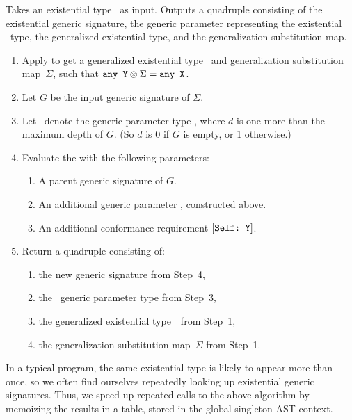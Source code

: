 \documentclass[../generics]{subfiles}
\begin{document}
\begin{algorithm}\label{alg:existential signature}
Takes an existential type \AnyX\ as input. Outputs a quadruple consisting of the existential generic signature, the generic parameter representing the existential \tSelf\ type, the generalized existential type, and the generalization substitution map.
\begin{enumerate}
\item Apply  to get a generalized existential type \AnyY\ and generalization substitution map~$\Sigma$, such that $\texttt{any~Y} \otimes \Sigma = \texttt{any~X}$.
\item Let $G$ be the input generic signature of $\Sigma$.
\item Let \tSelf\ denote the generic parameter type , where $d$ is one more than the maximum depth of $G$. (So $d$ is 0 if $G$ is empty, or 1 otherwise.)
\item Evaluate the  with the following parameters:
\begin{enumerate}
\item A parent generic signature of $G$.
\item An additional generic parameter \tSelf, constructed above.
\item An additional conformance requirement $[\texttt{Self:~Y}]$.
\end{enumerate}
\item Return a quadruple consisting of:
\begin{enumerate}
\item the new generic signature from Step~4,
\item the \tSelf\ generic parameter type from Step~3,
\item the generalized existential type~\tY\ from Step~1,
\item the generalization substitution map~$\Sigma$ from Step~1.
\end{enumerate}
\end{enumerate}
\end{algorithm}

In a typical program, the same existential type is likely to appear more than once, so we often find ourselves repeatedly looking up existential generic signatures. Thus, we speed up repeated calls to the above algorithm by memoizing the results in a table, stored in the global singleton AST context.
\end{document}
